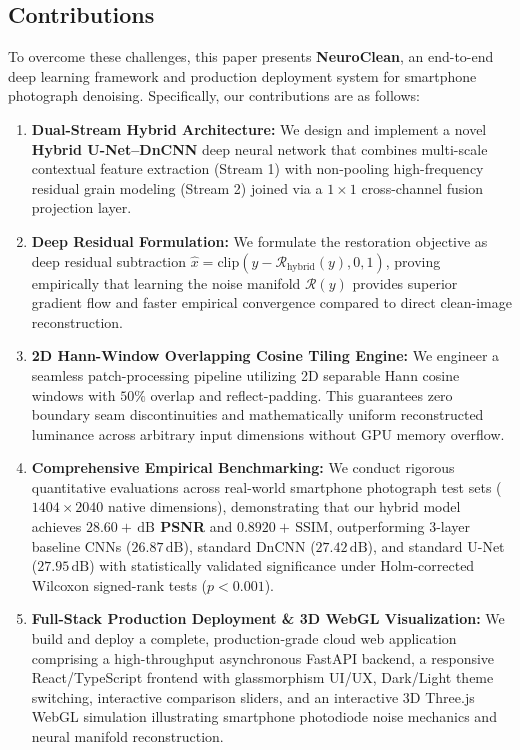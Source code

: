 \documentclass{ieeeaccess}
\begin{document}
\subsection{Contributions}
To overcome these challenges, this paper presents \textbf{NeuroClean}, an end-to-end deep learning framework and production deployment system for smartphone photograph denoising. Specifically, our contributions are as follows:
\begin{enumerate}
    \item \textbf{Dual-Stream Hybrid Architecture:} We design and implement a novel \textbf{Hybrid U-Net--DnCNN} deep neural network that combines multi-scale contextual feature extraction (Stream 1) with non-pooling high-frequency residual grain modeling (Stream 2) joined via a $1 \times 1$ cross-channel fusion projection layer.
    \item \textbf{Deep Residual Formulation:} We formulate the restoration objective as deep residual subtraction $\hat{x} = \text{clip}(y - \mathcal{R}_{\text{hybrid}}(y), 0, 1)$, proving empirically that learning the noise manifold $\mathcal{R}(y)$ provides superior gradient flow and faster empirical convergence compared to direct clean-image reconstruction.
    \item \textbf{2D Hann-Window Overlapping Cosine Tiling Engine:} We engineer a seamless patch-processing pipeline utilizing 2D separable Hann cosine windows with $50\%$ overlap and reflect-padding. This guarantees zero boundary seam discontinuities and mathematically uniform reconstructed luminance across arbitrary input dimensions without GPU memory overflow.
    \item \textbf{Comprehensive Empirical Benchmarking:} We conduct rigorous quantitative evaluations across real-world smartphone photograph test sets ($1404 \times 2040$ native dimensions), demonstrating that our hybrid model achieves \textbf{$28.60+\,\text{dB}$ PSNR} and \textbf{$0.8920+\,\text{SSIM}$}, outperforming 3-layer baseline CNNs ($26.87\,\text{dB}$), standard DnCNN ($27.42\,\text{dB}$), and standard U-Net ($27.95\,\text{dB}$) with statistically validated significance under Holm-corrected Wilcoxon signed-rank tests ($p < 0.001$).
    \item \textbf{Full-Stack Production Deployment \& 3D WebGL Visualization:} We build and deploy a complete, production-grade cloud web application comprising a high-throughput asynchronous FastAPI backend, a responsive React/TypeScript frontend with glassmorphism UI/UX, Dark/Light theme switching, interactive comparison sliders, and an interactive 3D Three.js WebGL simulation illustrating smartphone photodiode noise mechanics and neural manifold reconstruction.
\end{enumerate}
\end{document}
